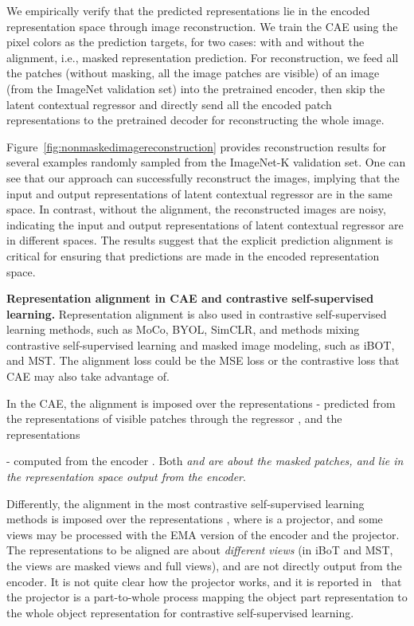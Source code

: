 \documentclass[twocolumn]{svjour3}          \smartqed  \usepackage{graphicx}
\begin{document}
We empirically verify
that the predicted representations
lie in the encoded representation space
through image reconstruction.
We train the CAE
using the pixel colors as the prediction targets,
for two cases:
with and without the alignment,
i.e., masked representation prediction.
For reconstruction, 
we feed all the patches (without masking,
all the image patches are visible)
of an image (from the ImageNet validation set)
into the pretrained encoder,
then skip the latent contextual regressor
and directly send all the encoded patch representations
to the pretrained decoder 
for reconstructing the whole image.


Figure~\ref{fig:nonmaskedimagereconstruction}
provides reconstruction results
for several examples randomly sampled 
from the ImageNet-K validation set.
One can see that
our approach can successfully reconstruct the images,
implying that the input and  output representations of latent contextual regressor
are in the same space. 
In contrast,
without the alignment,
the reconstructed images are noisy,
indicating 
the input and output representations of latent contextual regressor
are in different spaces.
The results suggest that
the explicit prediction alignment
is critical for
ensuring that predictions are made 
in the encoded representation space. 

\vspace{1mm}
\noindent\textbf{Representation alignment in CAE and contrastive self-supervised learning.}
Representation alignment is also used in contrastive self-supervised learning methods,
such as MoCo, BYOL, SimCLR,
and methods mixing contrastive self-supervised learning and masked image modeling,
such as iBOT, and MST.
The alignment loss could be the MSE loss or 
the contrastive loss that CAE may also take advantage of.

In the CAE, the alignment is imposed
over the representations
 - 
predicted from the representations 
of visible patches through the regressor ,
and the representations 
 
- computed from the encoder .
Both \emph{ and  are about the masked patches,
and lie in the representation space
output from the encoder}.

Differently,
the alignment in the  most 
contrastive self-supervised learning methods
is imposed 
over the representations ,
where  is a projector,
and some views may be processed
with the EMA version of the encoder
and the projector.
The  representations to be aligned
are about \emph{different views} 
(in iBoT and MST,
the views are masked views and full views),
and are not directly output from the encoder.
It is not quite clear how the projector works,
and it is reported in~\cite{MIMPart2022}
that the projector is a part-to-whole process
mapping the object part representation
to the whole object representation
for contrastive self-supervised learning.
\end{document}
